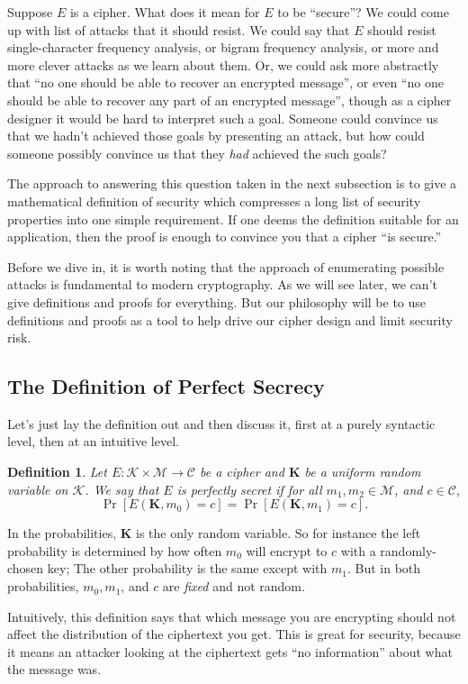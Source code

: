 \documentclass[11pt]{article}
\newtheorem{definition}{Definition}
\newcommand{\msgs}{\mathcal{M}}
\newcommand{\ctxts}{\mathcal{C}}
\newcommand{\keys}{\mathcal{K}}
\newcommand{\enc}{E}
\newcommand{\bK}{\mathbf{K}}
\begin{document}
Suppose $E$ is a cipher. What does it mean for $E$ to be ``secure''? We could come
up with list of attacks that it should resist. We could say that $E$ should
resist single-character frequency analysis, or bigram frequency analysis, or
more and more clever attacks as we learn about them.  Or, we could ask
more abstractly that ``no one should be able to recover an encrypted message'',
or even ``no one should be able to recover any part of an encrypted message'',
though as a cipher designer it would be hard to interpret such a goal. Someone
could convince us that we hadn't achieved those goals by presenting an attack,
but how could someone possibly convince us that they \emph{had} achieved the
such goals? 

The approach to answering this question taken in the next subsection is to give
a mathematical definition of security which compresses a long list of
security properties into one simple requirement. If one deems the
definition suitable for an application, then the proof is enough to convince
you that a cipher ``is secure.''

Before we dive in, it is worth noting that the approach of enumerating possible
attacks is fundamental to modern cryptography. As we will see later, we can't
give definitions and proofs for everything. But our philosophy will be to use
definitions and proofs as a tool to help drive our cipher design and limit
security risk.

\subsection{The Definition of Perfect Secrecy}

Let's just lay the definition out and then discuss it, first at a purely
syntactic level, then at an intuitive level.
\begin{definition}Let $\enc : \keys\times\msgs \to \ctxts$ be a cipher and
    $\bK$ be a uniform random variable on $\keys$.  We say that $\enc$ is
    \emph{perfectly secret} if for all $m_1,m_2\in\msgs$, and $c\in\ctxts$,
    \[
        \Pr[\enc(\bK,m_0) = c] = \Pr[\enc(\bK,m_1) = c].
    \]
\end{definition}
In the probabilities, $\bK$ is the only random variable. So for instance
the left probability is determined by how often $m_0$ will encrypt to
$c$ with a randomly-chosen key; The other probability is the same except
with $m_1$. But in both probabilities, $m_0,m_1$, and $c$ are \emph{fixed}
and not random.

Intuitively, this definition says that which message you are encrypting
should not affect the distribution of the ciphertext you get. This is great
for security, because it means an attacker looking at the ciphertext gets
``no information'' about what the message was.
\end{document}
